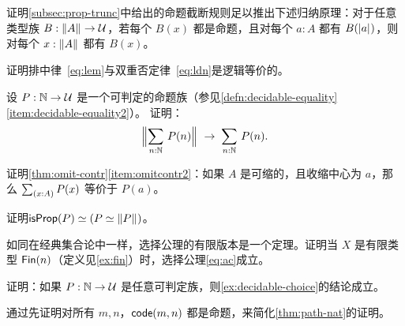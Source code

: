 \begin{ex}\label{ex:prop-trunc-ind}
  证明\cref{subsec:prop-trunc}中给出的命题截断规则足以推出下述归纳原理：对于任意类型族 $B:\mathopen{}\left\Vert A\right\Vert_{}\mathclose{} \to \mathcal{U}$，若每个 $B(x)$ 都是命题，且对每个 $a:A$ 都有 $B(\mathopen{}\left|a\right|_{}^{}\mathclose{})$，则对每个 $x:\mathopen{}\left\Vert A\right\Vert_{}\mathclose{}$ 都有 $B(x)$。
\end{ex}

\begin{ex}\label{ex:lem-ldn}
  证明排中律~\eqref{eq:lem}与双重否定律~\eqref{eq:ldn}是逻辑等价的。
\end{ex}

\begin{ex}\label{ex:decidable-choice}
  设 $P:\mathbb{N}\to\mathcal{U}$ 是一个可判定的命题族（参见\cref{defn:decidable-equality}\ref{item:decidable-equality2}）。
  证明：
  \[ \Brck{\sm{n:\nat} P(n)} \;\to\; \sm{n:\nat}P(n).\]
\end{ex}

\begin{ex}\label{ex:omit-contr2}
  证明\cref{thm:omit-contr}\ref{item:omitcontr2}：如果 $A$ 是可缩的，且收缩中心为 $a$，那么 $\sm{x:A} P(x)$ 等价于 $P(a)$。
\end{ex}

\begin{ex}\label{ex:isprop-equiv-equiv-bracket}
  证明$\mathsf{isProp}(P) \simeq (P \simeq \mathopen{}\left\Vert P\right\Vert_{}\mathclose{})$。
\end{ex}

\begin{ex}\label{ex:finite-choice}
  如同在经典集合论中一样，选择公理的有限版本是一个定理。证明当 $X$ 是有限类型 $\mathsf{Fin}(n)$（定义见\cref{ex:fin}）时，选择公理\eqref{eq:ac}成立。
\end{ex}

\begin{ex}\label{ex:decidable-choice-strong}
  证明：如果 $P:\mathbb{N}\to\mathcal{U}$ 是任意可判定族，则\cref{ex:decidable-choice}的结论成立。
\end{ex}

\begin{ex}\label{ex:n-set}
  通过先证明对所有 $m,n$，$\mathsf{code}(m,n)$ 都是命题，来简化\cref{thm:path-nat}的证明。
\end{ex}

